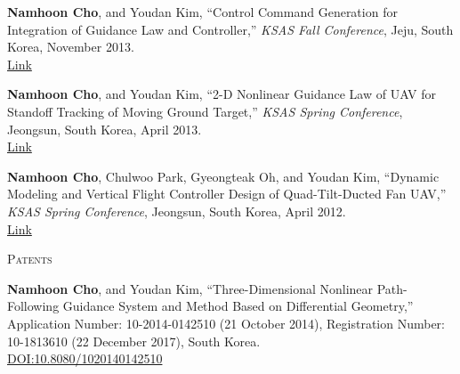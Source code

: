 \begin{enumerate}[itemsep=0.5em, label={[}NC\arabic*{]}]
\item \textbf{Namhoon Cho}, and Youdan Kim, ``Control Command Generation for Integration of Guidance Law and Controller,'' \textit{KSAS Fall Conference}, Jeju, South Korea, November 2013. \\
\href{https://www.dbpia.co.kr/journal/articleDetail?nodeId=NODE02328340}{Link}

\item \textbf{Namhoon Cho}, and Youdan Kim, ``2-D Nonlinear Guidance Law of UAV for Standoff Tracking of Moving Ground Target,'' \textit{KSAS Spring Conference}, Jeongsun, South Korea, April 2013. \\
\href{https://www.dbpia.co.kr/journal/articleDetail?nodeId=NODE02278216}{Link}

\item \textbf{Namhoon Cho}, Chulwoo Park, Gyeongteak Oh, and Youdan Kim, ``Dynamic Modeling and Vertical Flight Controller Design of Quad-Tilt-Ducted Fan UAV,'' \textit{KSAS Spring Conference}, Jeongsun, South Korea, April 2012. \\
\href{https://www.dbpia.co.kr/journal/articleDetail?nodeId=NODE01838585}{Link}

\end{enumerate}
\vspace{0.5em}

\textsc{Patents}
\vspace{0.5em}
\begin{enumerate}[itemsep=0.5em, label={[}P\arabic*{]}]
\item \textbf{Namhoon Cho}, and Youdan Kim, ``Three-Dimensional Nonlinear Path-Following Guidance System and Method Based on Differential Geometry,'' Application Number: 10-2014-0142510 (21 October 2014), Registration Number: 10-1813610 (22 December 2017), South Korea. \\
\href{https://doi.org/10.8080/1020140142510}{DOI:10.8080/1020140142510}

\end{enumerate}
